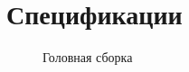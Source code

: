 \chapter{Спецификации}

\begin{figure}[h!]
    \centering
    \imgplaceholder
    \caption{Головная сборка}
\end{figure}


